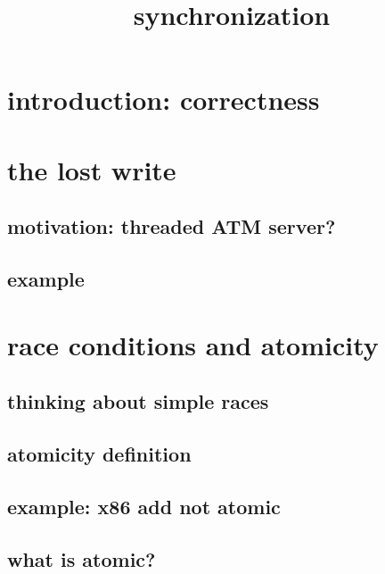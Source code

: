 \graphicspath{{./figures/}}
\title{synchronization}
\date{}

\begin{frame}
    \titlepage
\end{frame}


\section{introduction: correctness}



\section{the lost write}

\subsection{motivation: threaded ATM server?}


\subsection{example}


\section{race conditions and atomicity}
\subsection{thinking about simple races} 


\subsection{atomicity definition}



\subsection{example: x86 add not atomic}



\subsection{what is atomic?}

